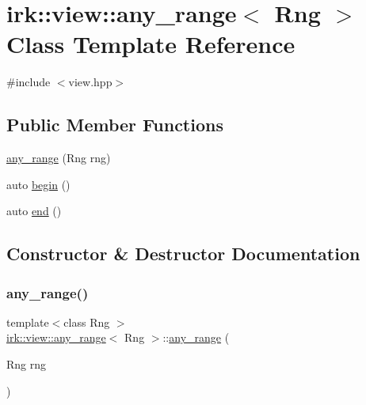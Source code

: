 \hypertarget{classirk_1_1view_1_1any__range}{}\section{irk\+:\+:view\+:\+:any\+\_\+range$<$ Rng $>$ Class Template Reference}
\label{classirk_1_1view_1_1any__range}


{\ttfamily \#include $<$view.\+hpp$>$}

\subsection*{Public Member Functions}
\begin{DoxyCompactItemize}
\item 
\mbox{\hyperlink{classirk_1_1view_1_1any__range_a48e7d98cb2e09eff6652dc7ead152bbd}{any\+\_\+range}} (Rng rng)
\item 
auto \mbox{\hyperlink{classirk_1_1view_1_1any__range_ab75107cb78021f372510402b71a0c4d5}{begin}} ()
\item 
auto \mbox{\hyperlink{classirk_1_1view_1_1any__range_ac176e096d851d509b2fb3f22a28cd401}{end}} ()
\end{DoxyCompactItemize}


\subsection{Constructor \& Destructor Documentation}
\mbox{\label{classirk_1_1view_1_1any__range_a48e7d98cb2e09eff6652dc7ead152bbd}} 
\subsubsection{\texorpdfstring{any\+\_\+range()}{any\_range()}}
{\footnotesize\ttfamily template$<$class Rng $>$ \\
\mbox{\hyperlink{classirk_1_1view_1_1any__range}{irk\+::view\+::any\+\_\+range}}$<$ Rng $>$\+::\mbox{\hyperlink{classirk_1_1view_1_1any__range}{any\+\_\+range}} (\begin{DoxyParamCaption}\item[{Rng}]{rng }\end{DoxyParamCaption})\hspace{0.3cm}{\ttfamily [inline]}}



